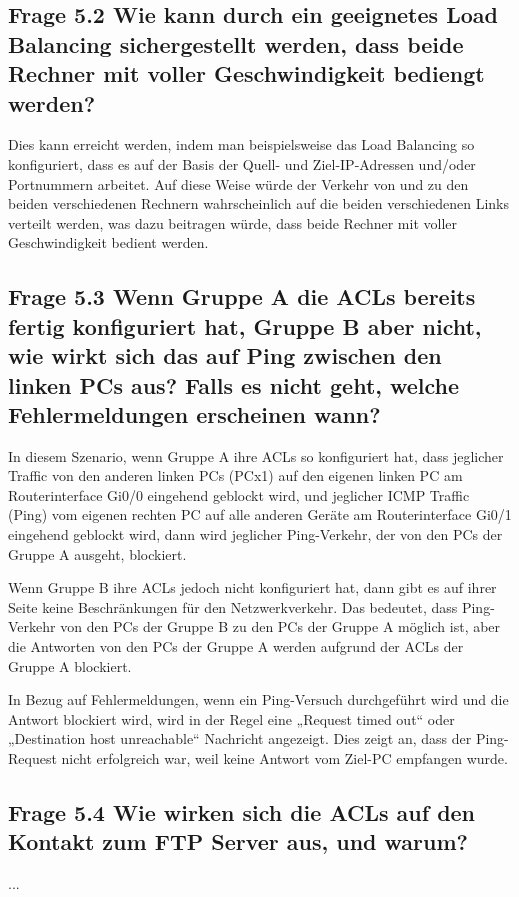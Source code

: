 \documentclass{article}
\begin{document}
\subsection*{Frage 5.2 \normalfont Wie kann durch ein geeignetes Load Balancing sichergestellt werden, dass beide Rechner mit voller Geschwindigkeit bediengt werden?}
Dies kann erreicht werden, indem man beispielsweise das Load Balancing so konfiguriert, dass es auf der Basis der Quell- und Ziel-IP-Adressen und/oder Portnummern arbeitet. Auf diese Weise würde der Verkehr von und zu den beiden verschiedenen Rechnern wahrscheinlich auf die beiden verschiedenen Links verteilt werden, was dazu beitragen würde, dass beide Rechner mit voller Geschwindigkeit bedient werden.\\

\subsection*{Frage 5.3 \normalfont Wenn Gruppe A die ACLs bereits fertig konfiguriert hat, Gruppe B aber nicht, wie wirkt sich das auf Ping zwischen den linken PCs aus? Falls es nicht geht, welche Fehlermeldungen erscheinen wann?}
In diesem Szenario, wenn Gruppe A ihre ACLs so konfiguriert hat, dass jeglicher Traffic von den anderen linken PCs (PCx1) auf den eigenen linken PC am Routerinterface Gi0/0 eingehend geblockt wird, und jeglicher ICMP Traffic (Ping) vom eigenen rechten PC auf alle anderen Geräte am Routerinterface Gi0/1 eingehend geblockt wird, dann wird jeglicher Ping-Verkehr, der von den PCs der Gruppe A ausgeht, blockiert.

Wenn Gruppe B ihre ACLs jedoch nicht konfiguriert hat, dann gibt es auf ihrer Seite keine Beschränkungen für den Netzwerkverkehr. Das bedeutet, dass Ping-Verkehr von den PCs der Gruppe B zu den PCs der Gruppe A möglich ist, aber die Antworten von den PCs der Gruppe A werden aufgrund der ACLs der Gruppe A blockiert.

In Bezug auf Fehlermeldungen, wenn ein Ping-Versuch durchgeführt wird und die Antwort blockiert wird, wird in der Regel eine „Request timed out“ oder „Destination host unreachable“ Nachricht angezeigt. Dies zeigt an, dass der Ping-Request nicht erfolgreich war, weil keine Antwort vom Ziel-PC empfangen wurde.\\

\subsection*{Frage 5.4 \normalfont Wie wirken sich die ACLs auf den Kontakt zum FTP Server aus, und warum?} 
...\\
\end{document}
